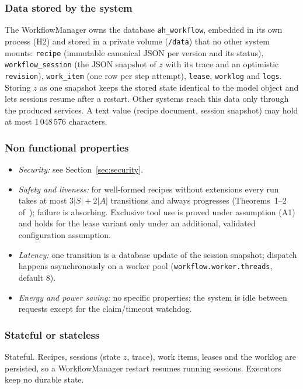 \documentclass[a4paper]{arrowhead}
\begin{document}
\subsubsection{Data stored by the system}
The WorkflowManager owns the database \texttt{ah\_workflow}, embedded in its own process (H2) and stored in a
private volume (\texttt{/data}) that no other system mounts: \texttt{recipe} (immutable canonical JSON per
version and its status), \texttt{workflow\_\allowbreak{}session} (the JSON snapshot of $z$ with its trace and an optimistic
\texttt{revision}), \texttt{work\_item} (one row per step attempt), \texttt{lease}, \texttt{worklog} and \texttt{logs}.
Storing $z$ as one snapshot keeps the stored state identical to the model object and lets sessions resume after a
restart. Other systems reach this data only through the produced services. A text value (recipe document, session
snapshot) may hold at most 1\,048\,576 characters.

\subsubsection{Non functional properties}
\begin{itemize}
\item \emph{Security:} see Section~\ref{sec:security}.
\item \emph{Safety and liveness:} for well-formed recipes without extensions every run takes at most $3|S| + 2|A|$
transitions and always progresses (Theorems~1--2 of~\cite{varga2026}); failure is absorbing. Exclusive tool use is
proved under assumption (A1) and holds for the lease variant only under an additional, validated configuration
assumption.
\item \emph{Latency:} one transition is a database update of the session snapshot; dispatch happens asynchronously on a
worker pool (\texttt{workflow.\allowbreak{}worker.\allowbreak{}threads}, default 8).
\item \emph{Energy and power saving:} no specific properties; the system is idle between requests except for the
claim/timeout watchdog.
\end{itemize}

\subsubsection{Stateful or stateless}
Stateful. Recipes, sessions (state $z$, trace), work items, leases and the worklog are persisted, so a
WorkflowManager restart resumes running sessions. Executors keep no durable state.
\end{document}
